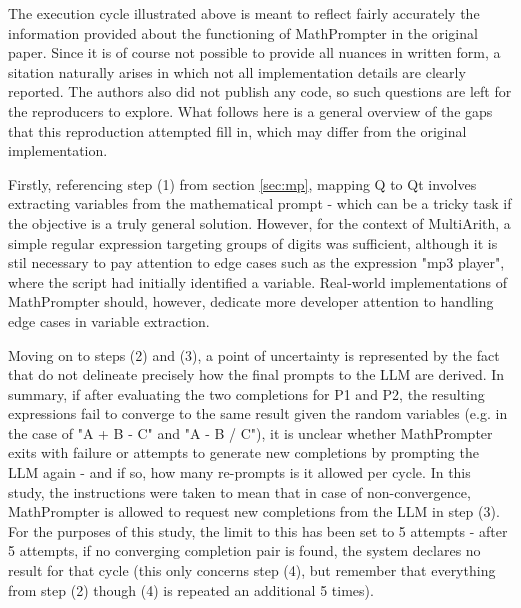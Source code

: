 \label{sec:repr}

The execution cycle illustrated above is meant to reflect fairly accurately the information provided about the functioning of MathPrompter in the original paper. Since it is of course not possible to provide all nuances in written form, a sitation naturally arises in which not all implementation details are clearly reported. The authors also did not publish any code, so such questions are left for the reproducers to explore. What follows here is a general overview of the gaps that this reproduction attempted fill in, which may differ from the original implementation.

Firstly, referencing step (1) from section \ref{sec:mp}, mapping Q to Qt involves extracting variables from the mathematical prompt - which can be a tricky task if the objective is a truly general solution. However, for the context of MultiArith, a simple regular expression targeting groups of digits was sufficient, although it is stil necessary to pay attention to edge cases such as the expression "mp3 player", where the script had initially identified a variable. Real-world implementations of MathPrompter should, however, dedicate more developer attention to handling edge cases in variable extraction. 

Moving on to steps (2) and (3), a point of uncertainty is represented by the fact that \citealt{imani-etal-2023-mathprompter} do not delineate precisely how the final prompts to the LLM are derived. In summary, if after evaluating the two completions for P1 and P2, the resulting expressions fail to converge to the same result given the random variables (e.g. in the case of "A + B - C" and "A - B / C"), it is unclear whether MathPrompter exits with failure or attempts to generate new completions by prompting the LLM again - and if so, how many re-prompts is it allowed per cycle. In this study, the instructions were taken to mean that in case of non-convergence, MathPrompter is allowed to request new completions from the LLM in step (3). For the purposes of this study, the limit to this has been set to 5 attempts - after 5 attempts, if no converging completion pair is found, the system declares no result for that cycle (this only concerns step (4), but remember that everything from step (2) though (4) is repeated an additional 5 times).

